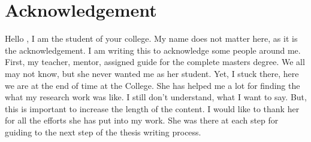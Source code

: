 \section*{Acknowledgement}
Hello , I am the student of your college. My name does not matter here, as it is the acknowledgement. I am writing this to acknowledge some people around me. First, my teacher, mentor, assigned guide for the complete masters degree. We all may not know, but she never wanted me as her student. Yet, I stuck there, here we are at the end of time at the College. She has helped me a lot for finding the what my research work was like. I still don't understand, what I want to say. But, this is important to increase the length of the content. I would like to thank her for all the efforts she has put into my work. She was there at each step for guiding to the next step of the thesis writing process.

